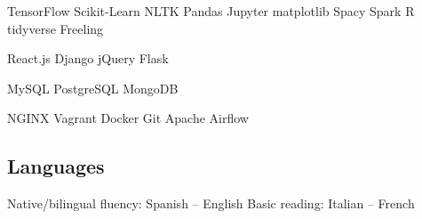 \documentclass[]{deedy-resume-openfont}
\begin{document}
\descript{}
\begin{tightemize}
\item TensorFlow \textbullet{} Scikit-Learn \textbullet{} NLTK \textbullet{} Pandas \textbullet{} Jupyter 
\textbullet{} matplotlib \textbullet{} Spacy \textbullet{} Spark \textbullet{} R tidyverse
\textbullet{} Freeling
\item React.js \textbullet{} Django \textbullet{} jQuery 
\textbullet{} Flask %
\item MySQL \textbullet{} PostgreSQL \textbullet{} MongoDB %
\item NGINX \textbullet{} Vagrant \textbullet{} Docker \textbullet{} Git \textbullet{} Apache Airflow
\end{tightemize}
\sectionsep

\subsection{Languages}
Native/bilingual fluency: Spanish -- English \textbullet{} Basic reading: 
Italian -- French
\end{document}
